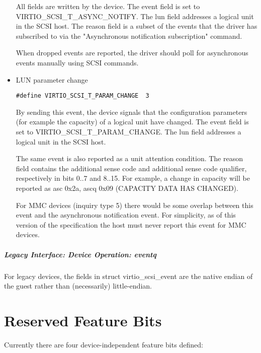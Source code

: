 \begin{itemize}
  All fields are written by the device. The event field is set to
  VIRTIO_SCSI_T_ASYNC_NOTIFY. The lun field addresses a logical
  unit in the SCSI host. The reason field is a subset of the
  events that the driver has subscribed to via the "Asynchronous
  notification subscription" command.

  When dropped events are reported, the driver should poll for
  asynchronous events manually using SCSI commands.

  \item LUN parameter change
\begin{lstlisting}
#define VIRTIO_SCSI_T_PARAM_CHANGE  3
\end{lstlisting}

  By sending this event, the device signals that the configuration parameters
  (for example the capacity) of a logical unit have changed.
  The event field is set to VIRTIO_SCSI_T_PARAM_CHANGE.
  The lun field addresses a logical unit in the SCSI host.

  The same event is also reported as a unit attention condition.
  The reason field contains the additional sense code and additional sense code qualifier,
  respectively in bits 0..7 and 8..15.
  For example, a change in capacity will be reported as asc 0x2a, ascq 0x09
  (CAPACITY DATA HAS CHANGED).

  For MMC devices (inquiry type 5) there would be some overlap between this
  event and the asynchronous notification event.
  For simplicity, as of this version of the specification the host must
  never report this event for MMC devices.
\end{itemize}

\paragraph{Legacy Interface: Device Operation: eventq}\label{sec:Device Types / SCSI Host Device / Device Operation / Device Operation: eventq / Legacy Interface: Device Operation: eventq}
For legacy devices, the fields in struct virtio_scsi_event are the
native endian of the guest rather than (necessarily) little-endian.

\chapter{Reserved Feature Bits}\label{sec:Reserved Feature Bits}

Currently there are four device-independent feature bits defined:

